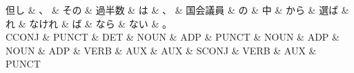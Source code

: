 \documentclass[tikz,border=5pt]{standalone}
\begin{document}
\normalsize
\begin{dependency}[edge unit distance=12.0pt]
    \begin{deptext}[column sep=1em]
        但し \& 、 \& その \& 過半数 \& は \& 、 \& 国会議員 \& の \& 中 \& から \& 選ば \& れ \& なけれ \& ば \& なら \& ない \& 。\\
        CCONJ \& PUNCT \& DET \& NOUN \& ADP \& PUNCT \& NOUN \& ADP \& NOUN \& ADP \& VERB \& AUX \& AUX \& SCONJ \& VERB \& AUX \& PUNCT\\
    \end{deptext}
\end{dependency}
\end{document}
